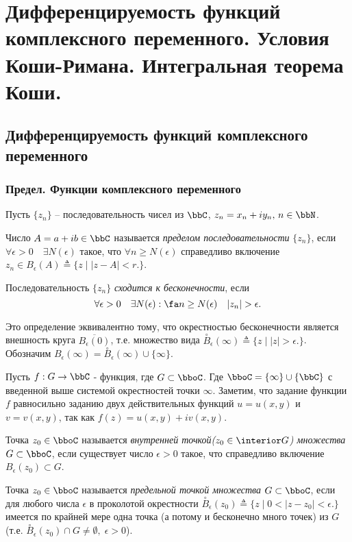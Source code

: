 \chapter{Дифференцируемость функций комплексного переменного. Условия Коши-Римана. Интегральная теорема Коши.}
\section{Дифференцируемость функций комплексного переменного}

\subsection{Предел. Функции комплексного переменного}
Пусть $\{z_n\}$ -- последовательность чисел из $\bbC$, $z_n=x_n+iy_n, \, n \in \bbN$. 
\begin{defn}
Число $A = a+ib \in \bbC$ называется \textit{пределом последовательности} $\{z_n\}$, если $\forall \epsilon > 0\quad \exists N(\epsilon)$ такое, что $\forall n \ge N(\epsilon) $ справедливо включение $z_n \in B_\epsilon(A) \triangleq \{z \;\bigl|\; |z-A|<r \bigl.\}$.
\end{defn}
\begin{defn}
Последовательность $\{z_n\}$ \textit{сходится к бесконечности}, если 
$$
\forall \epsilon > 0\quad \exists N(\epsilon): \fa n \ge N(\epsilon) \quad |z_n|>\epsilon.
$$
\end{defn} 
Это определение эквивалентно тому, что окрестностью бесконечности является внешность круга $\overline{B_\epsilon(0)}$, т.е. множество вида $\overset{\circ} {B}_\epsilon(\infty)\triangleq \{z \;\bigl|\; |z|>\epsilon \bigl.\}$. Обозначим $B_\epsilon(\infty)=\overset{\circ} {B}_\epsilon(\infty) \cup\{\infty\}$.

Пусть $f: G\to \bbC$ - функция, где $G \subset \bboC$. Где ${\bboC =\{\infty\} \cup \{\bbC\}}$ с введенной выше системой окрестностей точки $\infty$. Заметим, что задание функции $f$ равносильно заданию двух действительных функций $u=u(x,y)$ и $v=v(x,y)$, так как $f(z)=u(x,y)+iv(x,y)$.
\begin{defn}
Точка $z_0 \in \bboC$ называется \textit{внутренней точкой($z_0 \in \interior G$) множества} $G \subset \bboC$, если существует число $\epsilon > 0$ такое, что справедливо включение $B_\epsilon (z_0) \subset G$.
\end{defn} 

\begin{defn}
Точка $z_0 \in \bboC$ называется \textit{предельной точкой множества} $G \subset \bboC$, если для любого числа $\epsilon$ в проколотой окрестности $\overset{\circ} {B}_\epsilon(z_0)\triangleq \{z \;\bigl|\; 0<|z-z_0|<\epsilon \bigl.\}$ имеется по крайней мере одна точка (а потому и бесконечно много точек) из $G$ (т.е. $\overset{\circ} {B}_\epsilon(z_0) \cap G \neq \emptyset,\; \epsilon > 0$).
\end{defn}

